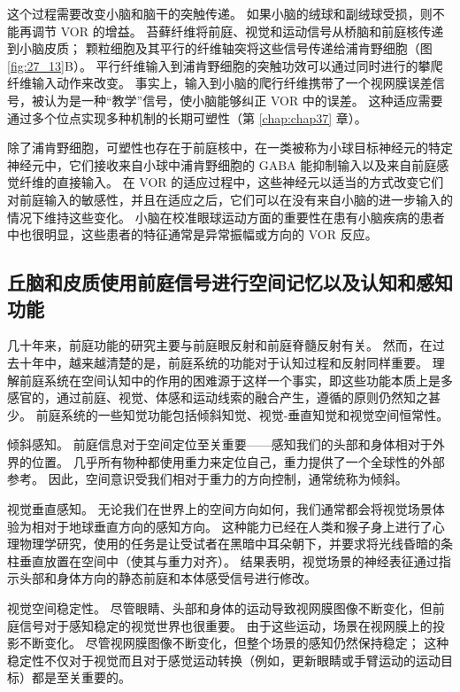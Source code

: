 这个过程需要改变小脑和脑干的突触传递。
如果小脑的绒球和副绒球受损，则不能再调节 VOR 的增益。
苔藓纤维将前庭、视觉和运动信号从桥脑和前庭核传递到小脑皮质；
颗粒细胞及其平行的纤维轴突将这些信号传递给浦肯野细胞（图 \ref{fig:27_13}B）。
平行纤维输入到浦肯野细胞的突触功效可以通过同时进行的攀爬纤维输入动作来改变。
事实上，输入到小脑的爬行纤维携带了一个视网膜误差信号，被认为是一种“教学”信号，使小脑能够纠正 VOR 中的误差。
这种适应需要通过多个位点实现多种机制的长期可塑性（第 \ref{chap:chap37} 章）。


除了浦肯野细胞，可塑性也存在于前庭核中，在一类被称为小球目标神经元的特定神经元中，它们接收来自小球中浦肯野细胞的 GABA 能抑制输入以及来自前庭感觉纤维的直接输入。
在 VOR 的适应过程中，这些神经元以适当的方式改变它们对前庭输入的敏感性，并且在适应之后，它们可以在没有来自小脑的进一步输入的情况下维持这些变化。
小脑在校准眼球运动方面的重要性在患有小脑疾病的患者中也很明显，这些患者的特征通常是异常振幅或方向的 VOR 反应。


\subsection{丘脑和皮质使用前庭信号进行空间记忆以及认知和感知功能}

几十年来，前庭功能的研究主要与前庭眼反射和前庭脊髓反射有关。
然而，在过去十年中，越来越清楚的是，前庭系统的功能对于认知过程和反射同样重要。
理解前庭系统在空间认知中的作用的困难源于这样一个事实，即这些功能本质上是多感官的，通过前庭、视觉、体感和运动线索的融合产生，遵循的原则仍然知之甚少。
前庭系统的一些知觉功能包括倾斜知觉、视觉-垂直知觉和视觉空间恒常性。


倾斜感知。 前庭信息对于空间定位至关重要——感知我们的头部和身体相对于外界的位置。
几乎所有物种都使用重力来定位自己，重力提供了一个全球性的外部参考。
因此，空间意识受我们相对于重力的方向控制，通常统称为倾斜。


视觉垂直感知。
无论我们在世界上的空间方向如何，我们通常都会将视觉场景体验为相对于地球垂直方向的感知方向。
这种能力已经在人类和猴子身上进行了心理物理学研究，使用的任务是让受试者在黑暗中耳朵朝下，并要求将光线昏暗的条柱垂直放置在空间中（使其与重力对齐）。
结果表明，视觉场景的神经表征通过指示头部和身体方向的静态前庭和本体感受信号进行修改。


视觉空间稳定性。
尽管眼睛、头部和身体的运动导致视网膜图像不断变化，但前庭信号对于感知稳定的视觉世界也很重要。
由于这些运动，场景在视网膜上的投影不断变化。
尽管视网膜图像不断变化，但整个场景的感知仍然保持稳定；
这种稳定性不仅对于视觉而且对于感觉运动转换（例如，更新眼睛或手臂运动的运动目标）都是至关重要的。


